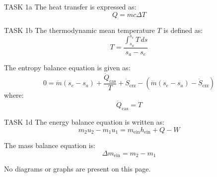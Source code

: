 TASK 1a  
The heat transfer is expressed as:  
\[
Q = m c \Delta T
\]  

TASK 1b  
The thermodynamic mean temperature \( T \) is defined as:  
\[
T = \frac{\int_{s_a}^{s_e} T \, ds}{s_a - s_e}
\]  

The entropy balance equation is given as:  
\[
0 = \dot{m}(s_e - s_a) + \frac{\dot{Q}_{\text{cas}}}{T} + \dot{S}_{\text{crz}} - \left( \dot{m}(s_e - s_a) - \dot{S}_{\text{crz}} \right)
\]  
where:  
\[
\dot{Q}_{\text{cas}} = T
\]  

TASK 1d  
The energy balance equation is written as:  
\[
m_2 u_2 - m_1 u_1 = m_{\text{ein}} h_{\text{ein}} + Q - W
\]  

The mass balance equation is:  
\[
\Delta m_{\text{ein}} = m_2 - m_1
\]  

No diagrams or graphs are present on this page.